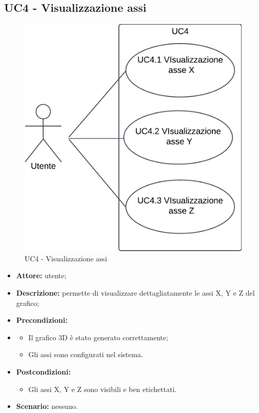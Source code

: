 \subsection{UC4 - Visualizzazione assi}
\begin{figure}[h!]
    \centering
    \includegraphics[scale=0.7]{template/images/UC4.png}
    \caption{UC4 - Visualizzazione assi}
\end{figure}
\begin{itemize}
    \item \textbf{Attore:} utente;
    \item \textbf{Descrizione:} permette di visualizzare dettagliatamente le assi X, Y e Z del grafico;
    \item \textbf{Precondizioni:} 
    \item \begin{itemize}
        \item Il grafico 3D è stato generato correttamente;
        \item Gli assi sono configurati nel sistema.
    \end{itemize}
    \item \textbf{Postcondizioni:}
    \begin{itemize}
        \item Gli assi X, Y e Z sono visibili e ben etichettati.
    \end{itemize}
    \item \textbf{Scenario:} nessuno.
\end{itemize}
